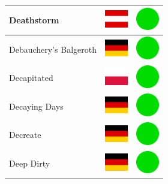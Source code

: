 \documentclass[12pt, a4paper, twoside]{report}
\begin{document}
\begin{center}
\begin{longtable}{|p{5cm}|p{2cm}|p{2cm}|}
Deathstorm & \includegraphics[width=1cm]{4x3/at} & \includegraphics[width=1cm]{likes/y} \\ \hline
Debauchery's Balgeroth & \includegraphics[width=1cm]{4x3/de} & \includegraphics[width=1cm]{likes/y} \\ \hline
Decapitated & \includegraphics[width=1cm]{4x3/pl} & \includegraphics[width=1cm]{likes/y} \\ \hline
Decaying Days & \includegraphics[width=1cm]{4x3/de} & \includegraphics[width=1cm]{likes/y} \\ \hline
Decreate & \includegraphics[width=1cm]{4x3/de} & \includegraphics[width=1cm]{likes/y} \\ \hline
Deep Dirty & \includegraphics[width=1cm]{4x3/de} & \includegraphics[width=1cm]{likes/y} \\ \hline

\end{longtable}
\end{center}
\end{document}
